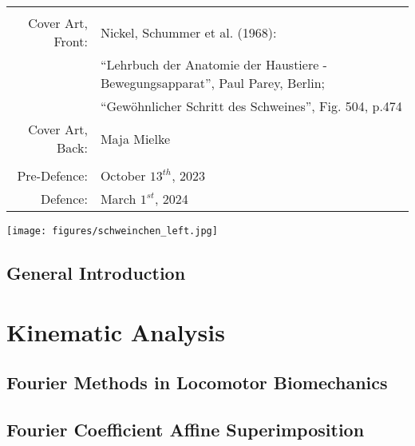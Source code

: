 \documentclass[12pt,a4paper,twoside]{report}
\newcommand\cleartoleftpage{
\ifodd\value{page}\hbox{}\clearpage\else\hbox{}\fi
}
\newcommand\cleartorightpage{
\ifodd\value{page}\hbox{}\clearpage\else\hbox{}\cleardoublepage\fi
\hbox{}
}
\begin{document}
\begin{spacing}{2}
\begin{footnotesize}
{\begin{tabular}{ r   l }
               \\
               \\ Cover Art, Front: & Nickel, Schummer et al. (1968): 
               \\ & ``Lehrbuch der Anatomie der Haustiere - Bewegungsapparat'', Paul Parey, Berlin;
               \\ &  ``Gewöhnlicher Schritt des Schweines'', Fig. 504, p.474
               \\ Cover Art, Back: & Maja Mielke
               \\
               \\ Pre-Defence: & October \(13^{th}\), 2023
               \\ Defence: & March \(1^{st}\), 2024
            \end{tabular}}
            \begin{flushright}
                \vspace{-1cm}\texttt{[image: figures/schweinchen\_left.jpg]}
            \end{flushright}
            \end{footnotesize}
        \end{spacing}
\makeatother
\thispagestyle{empty}

\onehalfspacing
\cleartorightpage
\setcounter{tocdepth}{1}
\begin{spacing}{1.0}
\tableofcontents
\end{spacing}

\chapter{General Introduction}\label{cpt:generalintro}
\clearpage




\cleartorightpage
\part{Kinematic Analysis}\label{pt:1}
\cleartoleftpage
\chapter{Fourier Methods in Locomotor Biomechanics}\label{cpt:fourier_review}


\cleartoleftpage
\chapter{Fourier Coefficient Affine Superimposition}\label{cpt:fcas}

\end{document}
